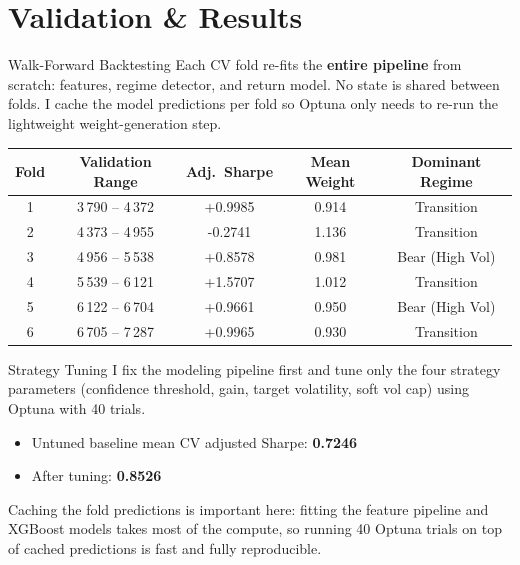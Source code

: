 \documentclass[aspectratio=169]{beamer}
\begin{document}
\section{Validation \& Results}

\begin{frame}{Walk-Forward Backtesting}
Each CV fold re-fits the \textbf{entire pipeline} from scratch: features, regime detector, and return model. No state is shared between folds. I cache the model predictions per fold so Optuna only needs to re-run the lightweight weight-generation step.

\vspace{0.15cm}
\begin{center}
\scriptsize
\begin{tabular}{ccccc}
    \toprule
    \textbf{Fold} & \textbf{Validation Range} & \textbf{Adj.\ Sharpe} & \textbf{Mean Weight} & \textbf{Dominant Regime} \\
    \midrule
    1 & 3\,790 -- 4\,372 & +0.9985 & 0.914 & Transition \\
    2 & 4\,373 -- 4\,955 & -0.2741 & 1.136 & Transition \\
    3 & 4\,956 -- 5\,538 & +0.8578 & 0.981 & Bear (High Vol) \\
    4 & 5\,539 -- 6\,121 & +1.5707 & 1.012 & Transition \\
    5 & 6\,122 -- 6\,704 & +0.9661 & 0.950 & Bear (High Vol) \\
    6 & 6\,705 -- 7\,287 & +0.9965 & 0.930 & Transition \\
    \bottomrule
\end{tabular}
\end{center}
\end{frame}

\begin{frame}{Strategy Tuning}
I fix the modeling pipeline first and tune only the four strategy parameters (confidence threshold, gain, target volatility, soft vol cap) using Optuna with 40 trials.

\vspace{0.2cm}
\begin{itemize}
    \item Untuned baseline mean CV adjusted Sharpe: \textbf{0.7246}
    \item After tuning: \textbf{0.8526}
\end{itemize}

\vspace{0.2cm}
Caching the fold predictions is important here: fitting the feature pipeline and XGBoost models takes most of the compute, so running 40 Optuna trials on top of cached predictions is fast and fully reproducible.
\end{frame}
\end{document}

